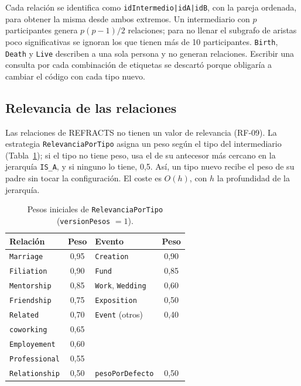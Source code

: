 Cada relación se identifica como \texttt{idIntermedio|idA|idB}, con la pareja ordenada, para obtener la misma desde ambos extremos. Un intermediario con $p$ participantes genera $p(p-1)/2$ relaciones; para no llenar el subgrafo de aristas poco significativas se ignoran los que tienen más de 10 participantes. \texttt{Birth}, \texttt{Death} y \texttt{Live} describen a una sola persona y no generan relaciones. Escribir una consulta por cada combinación de etiquetas se descartó porque obligaría a cambiar el código con cada tipo nuevo.

\subsection{Relevancia de las relaciones}
\label{sec:alg-relevancia}

Las relaciones de REFRACTS no tienen un valor de relevancia (RF-09). La estrategia \texttt{RelevanciaPorTipo} asigna un peso según el tipo del intermediario (Tabla~\ref{tab:pesos}); si el tipo no tiene peso, usa el de su antecesor más cercano en la jerarquía \texttt{IS\_A}, y si ninguno lo tiene, 0,5. Así, un tipo nuevo recibe el peso de su padre sin tocar la configuración. El coste es $O(h)$, con $h$ la profundidad de la jerarquía.

\begin{table}[htbp]
\centering
\small
\caption{Pesos iniciales de \texttt{RelevanciaPorTipo} (\texttt{versionPesos} $=1$).}
\label{tab:pesos}
\begin{tabular}{|l|c|l|c|}
\hline
\textbf{Relación} & \textbf{Peso} & \textbf{Evento} & \textbf{Peso} \\ \hline
\texttt{Marriage} & 0,95 & \texttt{Creation} & 0,90 \\ \hline
\texttt{Filiation} & 0,90 & \texttt{Fund} & 0,85 \\ \hline
\texttt{Mentorship} & 0,85 & \texttt{Work}, \texttt{Wedding} & 0,60 \\ \hline
\texttt{Friendship} & 0,75 & \texttt{Exposition} & 0,50 \\ \hline
\texttt{Related} & 0,70 & \texttt{Event} (otros) & 0,40 \\ \hline
\texttt{coworking} & 0,65 & & \\ \hline
\texttt{Employement} & 0,60 & & \\ \hline
\texttt{Professional} & 0,55 & & \\ \hline
\texttt{Relationship} & 0,50 & \texttt{pesoPorDefecto} & 0,50 \\ \hline
\end{tabular}
\end{table}

